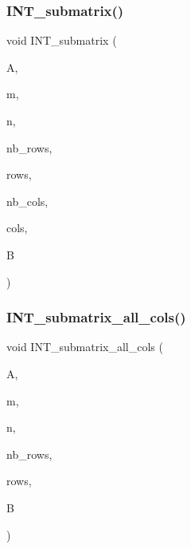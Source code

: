\mbox{\label{util_8_c_a8c4025edfbba86edca06704586772084}} 
\subsubsection{\texorpdfstring{I\+N\+T\+\_\+submatrix()}{INT\_submatrix()}}
{\footnotesize\ttfamily void I\+N\+T\+\_\+submatrix (\begin{DoxyParamCaption}\item[{\mbox{\hyperlink{galois_8h_a09fddde158a3a20bd2dcadb609de11dc}{I\+NT}} $\ast$}]{A,  }\item[{\mbox{\hyperlink{galois_8h_a09fddde158a3a20bd2dcadb609de11dc}{I\+NT}}}]{m,  }\item[{\mbox{\hyperlink{galois_8h_a09fddde158a3a20bd2dcadb609de11dc}{I\+NT}}}]{n,  }\item[{\mbox{\hyperlink{galois_8h_a09fddde158a3a20bd2dcadb609de11dc}{I\+NT}}}]{nb\+\_\+rows,  }\item[{\mbox{\hyperlink{galois_8h_a09fddde158a3a20bd2dcadb609de11dc}{I\+NT}} $\ast$}]{rows,  }\item[{\mbox{\hyperlink{galois_8h_a09fddde158a3a20bd2dcadb609de11dc}{I\+NT}}}]{nb\+\_\+cols,  }\item[{\mbox{\hyperlink{galois_8h_a09fddde158a3a20bd2dcadb609de11dc}{I\+NT}} $\ast$}]{cols,  }\item[{\mbox{\hyperlink{galois_8h_a09fddde158a3a20bd2dcadb609de11dc}{I\+NT}} $\ast$}]{B }\end{DoxyParamCaption})}

\mbox{\label{util_8_c_a5b6d301c6d0aad56ea8f89ca766360c9}} 
\subsubsection{\texorpdfstring{I\+N\+T\+\_\+submatrix\+\_\+all\+\_\+cols()}{INT\_submatrix\_all\_cols()}}
{\footnotesize\ttfamily void I\+N\+T\+\_\+submatrix\+\_\+all\+\_\+cols (\begin{DoxyParamCaption}\item[{\mbox{\hyperlink{galois_8h_a09fddde158a3a20bd2dcadb609de11dc}{I\+NT}} $\ast$}]{A,  }\item[{\mbox{\hyperlink{galois_8h_a09fddde158a3a20bd2dcadb609de11dc}{I\+NT}}}]{m,  }\item[{\mbox{\hyperlink{galois_8h_a09fddde158a3a20bd2dcadb609de11dc}{I\+NT}}}]{n,  }\item[{\mbox{\hyperlink{galois_8h_a09fddde158a3a20bd2dcadb609de11dc}{I\+NT}}}]{nb\+\_\+rows,  }\item[{\mbox{\hyperlink{galois_8h_a09fddde158a3a20bd2dcadb609de11dc}{I\+NT}} $\ast$}]{rows,  }\item[{\mbox{\hyperlink{galois_8h_a09fddde158a3a20bd2dcadb609de11dc}{I\+NT}} $\ast$}]{B }\end{DoxyParamCaption})}

